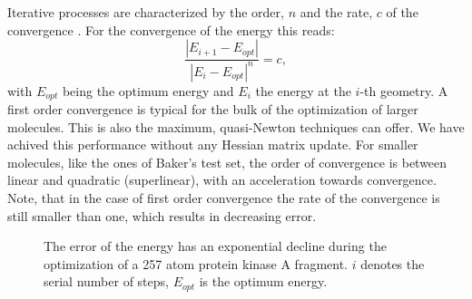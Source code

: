 \documentclass[prl,twocolumn,showpacs,twocolumngrid,superbib]{revtex4}
\begin{document}
Iterative processes are characterized by the order, $n$
and the rate, $c$ of the convergence \cite{Quarteroni}. 
For the convergence of the energy this reads:
\begin{equation}
\frac{|E_{i+1}-E_{opt}|}{|E_{i}-E_{opt}|^n}=c ,
\end{equation}
with $E_{opt}$ being the optimum energy and $E_{i}$ the energy
at the $i$-th geometry.
A first order convergence is typical for the bulk of the optimization
of larger molecules. This is also the maximum, quasi-Newton techniques 
can offer. We have achived this performance without any Hessian
matrix update.
For smaller molecules, like the ones of Baker's
test set, the order of convergence is between linear and quadratic
(superlinear), with an acceleration towards convergence.
Note, that in the case
of first order convergence the rate of the convergence is still
smaller than one, which results in decreasing error.
\begin{figure}[h]
\caption{
\small  
The error of the energy has an exponential decline during
the optimization of a 257 atom protein kinase A fragment. 
$i$ denotes the serial number of steps,
$E_{opt}$ is the optimum energy.
\label{logn-logde}
}
\end{figure}
%
%
%
%
\end{document}
